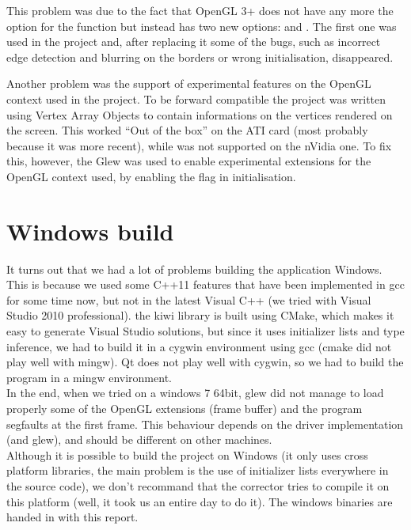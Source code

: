 This problem was due to the fact that OpenGL 3+ does not have any more the 
option for the  function but instead has two new options:
 and . The first one was
used in the project and, after replacing it some of the bugs, such as incorrect
edge detection and blurring on the borders or wrong initialisation, disappeared.

Another problem was the support of experimental features on the OpenGL context used
in the project. To be forward compatible the project was written using Vertex
Array Objects to contain informations on the vertices rendered on the screen.
This worked ``Out of the box'' on the ATI card (most probably because it was
more recent), while was not supported on the nVidia one. To fix this, however,
the Glew was used to enable experimental extensions for the OpenGL context used,
by enabling the  flag in initialisation.	

\section{Windows build}

It turns out that we had a lot of problems building the application Windows. This
is because we used some C++11 features that have been implemented in gcc for some
time now, but not in the latest Visual C++ (we tried with Visual Studio 2010 professional).
the kiwi library is built using CMake, which makes it easy to generate Visual Studio
solutions, but since it uses initializer lists and type inference, we had to build it
in a cygwin environment using gcc (cmake did not play well with mingw). Qt does not
play well with cygwin, so we had to build the program in a mingw environment.\\
In the end, when we tried on a windows 7 64bit, glew did not manage to load properly
some of the OpenGL extensions (frame buffer) and the program segfaults at the first
frame. This behaviour depends on the driver implementation (and glew), and should be
different on other machines.\\
Although it is possible to build the project on Windows (it only uses cross platform
libraries, the main problem is the use of initializer lists everywhere in the source code),
we don't recommand that the corrector tries to compile it on this platform (well,
it took us an entire day to do it). The windows binaries are handed in with this
report.\\

